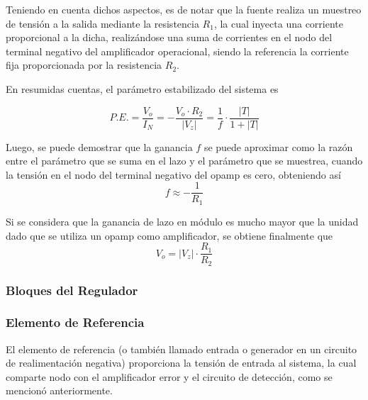 Teniendo en cuenta dichos aspectos, es de notar que la fuente realiza un muestreo de tensión a la salida mediante la resistencia $R_1$, la cual inyecta una corriente proporcional a la dicha, realizándose una suma de corrientes en el nodo del terminal negativo del amplificador operacional, siendo la referencia la corriente fija proporcionada por la resistencia $R_2$.

En resumidas cuentas, el parámetro estabilizado del sistema es

\begin{equation}
P.E. = \frac{V_o}{I_N} = -\frac{V_o \cdot R_2}{|V_z|} = \frac{1}{f} \cdot \frac{|T|}{1 + |T|}
\end{equation}

Luego, se puede demostrar que la ganancia $f$ se puede aproximar como la razón entre el parámetro que se suma en el lazo y el parámetro que se muestrea, cuando la tensión en el nodo del terminal negativo del opamp es cero, obteniendo así
\begin{equation}
f \approx -\frac{1}{R_1}
\end{equation}

Si se considera que la ganancia de lazo en módulo es mucho mayor que la unidad dado que se utiliza un opamp como amplificador, se obtiene finalmente que
\begin{equation}
V_o = |V_z| \cdot \frac{R_1}{R_2}
\label{eq:vovz}
\end{equation}

\subsubsection{Bloques del Regulador}
\subsubsection{Elemento de Referencia}

El elemento de referencia (o también llamado entrada o generador en un circuito de realimentación negativa) proporciona la tensión de entrada al sistema, la cual comparte nodo con el amplificador error y el circuito de detección, como se mencionó anteriormente.


